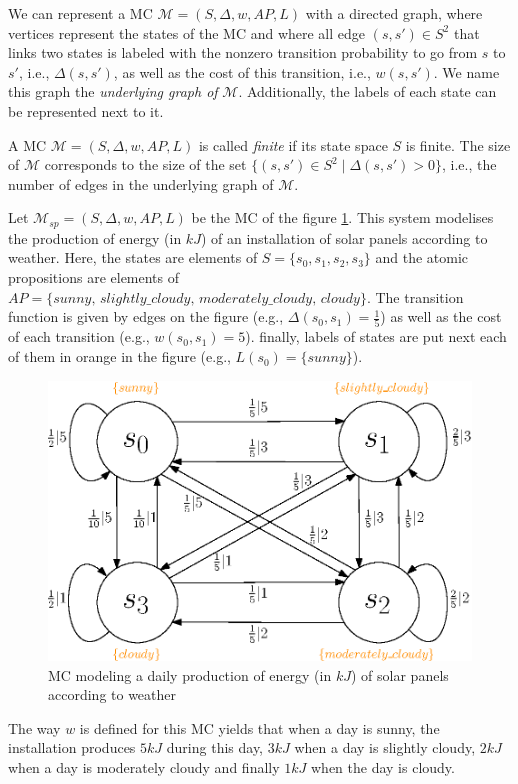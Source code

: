 We can represent a MC $\mathcal{M} = (S, \Delta, w, AP, L)$ with a directed graph, where vertices represent the states
of the MC and where all edge $(s, s') \in S^2$ that links two states is labeled with the nonzero transition probability to go from $s$ to $s'$, i.e., $\Delta(s, s')$, as well as the cost of this transition, i.e., $w(s, s')$.
We name this graph the \textit{underlying graph of} $\mathcal{M}$.
Additionally, the labels of each
state can be represented next to it.

\begin{notation}
  A MC $\mathcal{M}=(S, \Delta, w, AP, L)$ is called \textit{finite} if its state space $S$ is finite. The size of $\mathcal{M}$ corresponds to the size of the set
  $\{(s, s') \in S^2 \; | \; \Delta(s, s') > 0 \}$, i.e., the number of edges in the underlying graph of $\mathcal{M}$.
\end{notation}

\begin{example}\label{solar-panel}
  Let $\mathcal{M}_{sp} = (S, \Delta, w, AP, L)$ be the MC of the figure \ref{MCexample}. This system modelises the production of energy (in $kJ$) of
  an installation of solar panels according to weather.
  Here, the states are elements of $S = \{s_0, s_1, s_2, s_3\}$ and the atomic propositions are elements of $AP = \{sunny, \, slightly\_cloudy, \, moderately\_cloudy, \, cloudy \}$. The transition function is given by edges on the figure (e.g., $\Delta(s_0, s_1) = \frac{1}{5}$) as well as the
  cost of each transition (e.g., $w(s_0, s_1) = 5$). finally, labels of states
  are put next each of them in orange in the figure (e.g., $L(s_0) = \{sunny\}$).
  \begin{figure}[h!]
    \centering
    \includegraphics[width=0.6\linewidth]{resources/weather-solar-pannel}
    \caption{MC modeling a daily production of energy (in $kJ$) of solar panels according to weather}
    \label{MCexample}
  \end{figure}
  The way $w$ is defined for this MC yields that when a day is sunny, the installation produces $5 kJ$ during this day, $3 kJ$ when a day is slightly cloudy, $2 kJ$ when a day is moderately cloudy and finally $1 kJ$ when the day is cloudy.
\end{example}

